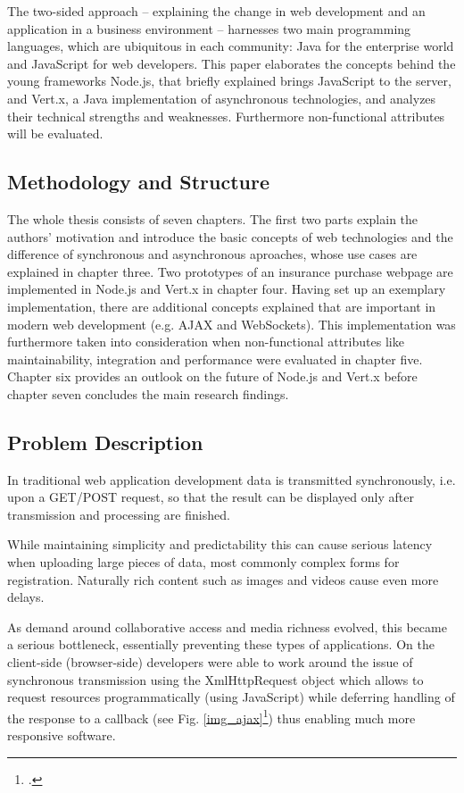 The two-sided approach – explaining the change in web development and an application in a 
business environment – harnesses two main programming languages, which are ubiquitous in each
community: Java for the enterprise world and JavaScript for web developers.
This paper elaborates the concepts behind the young frameworks Node.js, that briefly explained brings JavaScript to the server, and 
Vert.x, a Java implementation of asynchronous technologies, and analyzes their 
technical strengths and weaknesses. Furthermore non-functional attributes will be
evaluated.

\subsection{Methodology and Structure}
The whole thesis consists of seven chapters. The first two parts explain the authors' motivation and introduce the 
basic concepts of web technologies and the difference of synchronous and asynchronous aproaches, whose use cases are explained in chapter three.
Two prototypes of an insurance purchase webpage are implemented in Node.js and Vert.x in chapter four.
Having set up an exemplary implementation, there are additional concepts explained that are important in modern web development (e.g. AJAX and WebSockets). This implementation was furthermore taken into consideration when non-functional attributes like maintainability, integration and performance were evaluated in chapter five. Chapter six provides an outlook on the future of Node.js and Vert.x before chapter seven concludes the main research findings.

\subsection{Problem Description}

In traditional web application development data is transmitted synchronously,
i.e. upon a GET/POST request, so that the result can be displayed only after transmission
and processing are finished.

While maintaining simplicity and
predictability this can cause serious latency when uploading large pieces of
data, most commonly complex forms for registration. Naturally rich content such
as images and videos cause even more delays.

As demand around collaborative access and media richness evolved, this became a
serious bottleneck, essentially preventing these types of applications. On the
client-side (browser-side) developers were able to work around the issue of
synchronous transmission using the XmlHttpRequest object which allows to request
resources programmatically (using JavaScript) while
deferring handling of the response to a callback (see Fig. \ref{img_ajax}\footcite{img_ajax}) thus enabling much more responsive software.

